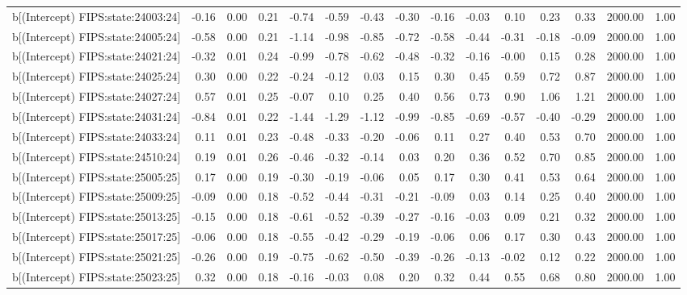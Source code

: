 \begin{table}[ht]
\begin{tabular}{rrrrrrrrrrrrrrr}
  b[(Intercept) FIPS:state:24003:24] & -0.16 & 0.00 & 0.21 & -0.74 & -0.59 & -0.43 & -0.30 & -0.16 & -0.03 & 0.10 & 0.23 & 0.33 & 2000.00 & 1.00 \\ 
  b[(Intercept) FIPS:state:24005:24] & -0.58 & 0.00 & 0.21 & -1.14 & -0.98 & -0.85 & -0.72 & -0.58 & -0.44 & -0.31 & -0.18 & -0.09 & 2000.00 & 1.00 \\ 
  b[(Intercept) FIPS:state:24021:24] & -0.32 & 0.01 & 0.24 & -0.99 & -0.78 & -0.62 & -0.48 & -0.32 & -0.16 & -0.00 & 0.15 & 0.28 & 2000.00 & 1.00 \\ 
  b[(Intercept) FIPS:state:24025:24] & 0.30 & 0.00 & 0.22 & -0.24 & -0.12 & 0.03 & 0.15 & 0.30 & 0.45 & 0.59 & 0.72 & 0.87 & 2000.00 & 1.00 \\ 
  b[(Intercept) FIPS:state:24027:24] & 0.57 & 0.01 & 0.25 & -0.07 & 0.10 & 0.25 & 0.40 & 0.56 & 0.73 & 0.90 & 1.06 & 1.21 & 2000.00 & 1.00 \\ 
  b[(Intercept) FIPS:state:24031:24] & -0.84 & 0.01 & 0.22 & -1.44 & -1.29 & -1.12 & -0.99 & -0.85 & -0.69 & -0.57 & -0.40 & -0.29 & 2000.00 & 1.00 \\ 
  b[(Intercept) FIPS:state:24033:24] & 0.11 & 0.01 & 0.23 & -0.48 & -0.33 & -0.20 & -0.06 & 0.11 & 0.27 & 0.40 & 0.53 & 0.70 & 2000.00 & 1.00 \\ 
  b[(Intercept) FIPS:state:24510:24] & 0.19 & 0.01 & 0.26 & -0.46 & -0.32 & -0.14 & 0.03 & 0.20 & 0.36 & 0.52 & 0.70 & 0.85 & 2000.00 & 1.00 \\ 
  b[(Intercept) FIPS:state:25005:25] & 0.17 & 0.00 & 0.19 & -0.30 & -0.19 & -0.06 & 0.05 & 0.17 & 0.30 & 0.41 & 0.53 & 0.64 & 2000.00 & 1.00 \\ 
  b[(Intercept) FIPS:state:25009:25] & -0.09 & 0.00 & 0.18 & -0.52 & -0.44 & -0.31 & -0.21 & -0.09 & 0.03 & 0.14 & 0.25 & 0.40 & 2000.00 & 1.00 \\ 
  b[(Intercept) FIPS:state:25013:25] & -0.15 & 0.00 & 0.18 & -0.61 & -0.52 & -0.39 & -0.27 & -0.16 & -0.03 & 0.09 & 0.21 & 0.32 & 2000.00 & 1.00 \\ 
  b[(Intercept) FIPS:state:25017:25] & -0.06 & 0.00 & 0.18 & -0.55 & -0.42 & -0.29 & -0.19 & -0.06 & 0.06 & 0.17 & 0.30 & 0.43 & 2000.00 & 1.00 \\ 
  b[(Intercept) FIPS:state:25021:25] & -0.26 & 0.00 & 0.19 & -0.75 & -0.62 & -0.50 & -0.39 & -0.26 & -0.13 & -0.02 & 0.12 & 0.22 & 2000.00 & 1.00 \\ 
  b[(Intercept) FIPS:state:25023:25] & 0.32 & 0.00 & 0.18 & -0.16 & -0.03 & 0.08 & 0.20 & 0.32 & 0.44 & 0.55 & 0.68 & 0.80 & 2000.00 & 1.00 \\ 

\end{tabular}
\end{table}
